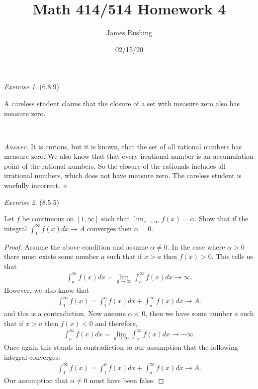 \documentclass[12pt,oneside]{amsart}
\title{Math 414/514 Homework 4}
\author{James Rushing}
\date{02/15/20}
\theoremstyle{definition}
\theoremstyle{remark}
\newtheorem{exer}{Exercise}
\numberwithin{equation}{exer}
\newenvironment{answer}{\bigskip\noindent\emph{Answer.}}{\hfill$\diamond$\newline}
\begin{document}
\maketitle

\begin{exer} (6.8.9)

A careless student claims that the closure of a set with measure zero also has measure zero. 
\end{exer}



\




\begin{answer}
It is curious, but it is known, that the set of all rational numbers has measure zero. We also know that that every irrational number is an accumulation point of the rational numbers. So the closure of the rationals includes all irrational numbers, which does not have measure zero. The careless student is woefully incorrect. 
\end{answer}


\newpage

\begin{exer} (8.5.5)

Let $f$ be continuous on $[1,\infty]$ such that $\lim_{x \to \infty} f(x) = \alpha$. Show that if the integral $\int_1^\infty f(x) dx \to A$ converges then $\alpha = 0$.

\end{exer}

\begin{proof}
    Assume the above condition and assume $\alpha \neq 0$. In the case where $\alpha > 0$ there must exists some number $a$ such that if $x>a$ then $f(x) >0$.  This tells us that 
\begin{align*}
    \int_a^\infty f(x)dx = \lim_{y \to \infty} \int_ a^\infty f(x) dx \to \infty.
\end{align*}
However,  we also know that 
\begin{align*}
    \int_1^\infty f(x) = \int_1^a f(x)dx + \int_a^\infty f(x) dx \to A.
\end{align*}
and this is a contradiction. Now assume $\alpha < 0$, then we have some number $a$ such that if $x>a$ then $f(x)<0$ and therefore,
\begin{align*}
    \int_a^\infty f(x)dx = \lim_{y \to \infty} \int_ a^\infty f(x) dx \to -\infty.
\end{align*}
Once again this stands in contradiction to our assumption that the following integral converges:
\begin{align*}
    \int_1^\infty f(x) = \int_1^a f(x)dx + \int_a^\infty f(x) dx \to A.
\end{align*}
Our assumption that $\alpha \neq 0$ must have been false.
\end{proof}
\end{document}
